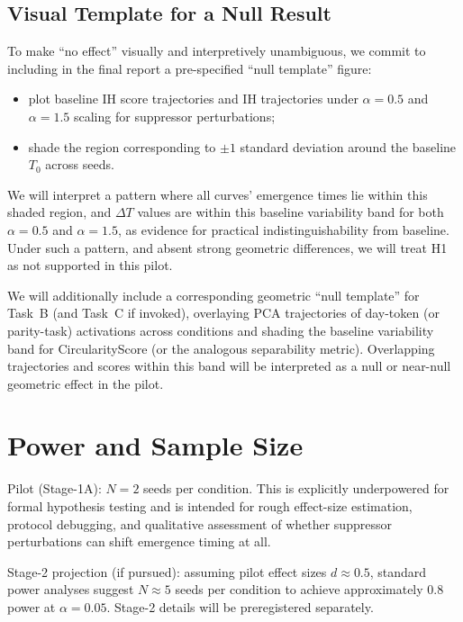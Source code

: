 \documentclass[11pt]{article}
\begin{document}
\subsection{Visual Template for a Null Result}

To make ``no effect'' visually and interpretively unambiguous, we commit to including in the final report a pre-specified ``null template'' figure:
\begin{itemize}
  \item plot baseline IH score trajectories and IH trajectories under $\alpha = 0.5$ and $\alpha = 1.5$ scaling for suppressor perturbations;
  \item shade the region corresponding to $\pm 1$ standard deviation around the baseline $T_0$ across seeds.
\end{itemize}

We will interpret a pattern where all curves' emergence times lie within this shaded region, and $\Delta T$ values are within this baseline variability band for both $\alpha = 0.5$ and $\alpha = 1.5$, as evidence for practical indistinguishability from baseline. Under such a pattern, and absent strong geometric differences, we will treat H1 as not supported in this pilot.

We will additionally include a corresponding geometric ``null template'' for Task~B (and Task~C if invoked), overlaying PCA trajectories of day-token (or parity-task) activations across conditions and shading the baseline variability band for CircularityScore (or the analogous separability metric). Overlapping trajectories and scores within this band will be interpreted as a null or near-null geometric effect in the pilot.

\section{Power and Sample Size}

Pilot (Stage-1A): $N = 2$ seeds per condition. This is explicitly underpowered for formal hypothesis testing and is intended for rough effect-size estimation, protocol debugging, and qualitative assessment of whether suppressor perturbations can shift emergence timing at all.

Stage-2 projection (if pursued): assuming pilot effect sizes $d \approx 0.5$, standard power analyses suggest $N \approx 5$ seeds per condition to achieve approximately 0.8 power at $\alpha = 0.05$. Stage-2 details will be preregistered separately.
\end{document}
